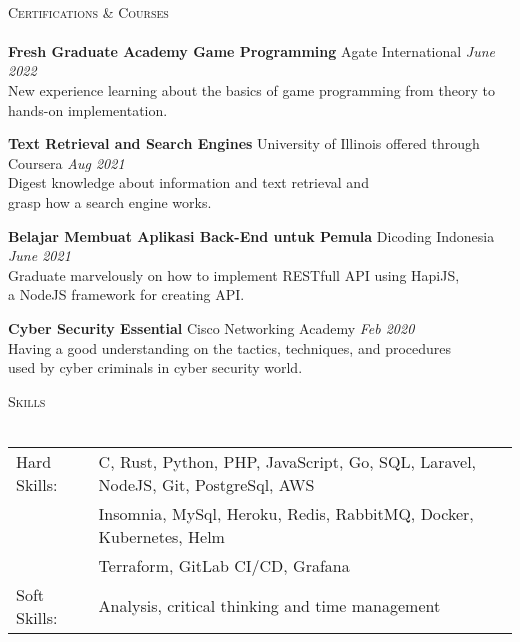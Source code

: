 \documentclass[a4paper]{article}
\newcommand{\lineunder} {
    \vspace*{-8pt} \\
    \hspace*{-18pt} \hrulefill \\
}
\newcommand{\header} [1] {
    {\hspace*{-18pt}\vspace*{6pt} \textsc{#1}}
    \vspace*{-6pt} \lineunder
}
\begin{document}
\

\header{Certifications \& Courses}
\textbf{Fresh Graduate Academy Game Programming} \hfill Agate International \textit{June 2022}\\
New experience learning about the basics of game programming from theory to hands-on implementation.
\vspace*{2mm}

\textbf{Text Retrieval and Search Engines} \hfill University of Illinois offered through Coursera \textit{Aug 2021}\\
Digest knowledge about information and text retrieval and\\ grasp how a search engine works.
\vspace*{2mm}

\textbf{Belajar Membuat Aplikasi Back-End untuk Pemula} \hfill Dicoding Indonesia \textit{June 2021}\\
Graduate marvelously on how to implement RESTfull API using HapiJS,\\a NodeJS framework for creating API.
\vspace*{2mm}



\textbf{Cyber Security Essential} \hfill Cisco Networking Academy \textit{Feb 2020}\\
Having a good understanding on the tactics, techniques, and procedures \\used by cyber criminals in cyber security world.
\vspace*{2mm}

\header{Skills}
\begin{tabular}{ l l }
	Hard Skills:              & C, Rust, Python, PHP, JavaScript, Go, SQL, Laravel, NodeJS, Git, PostgreSql, AWS\\ & Insomnia, MySql, Heroku, Redis, RabbitMQ, Docker, Kubernetes, Helm\\ & Terraform, GitLab CI/CD, Grafana\\
	Soft Skills:                    & Analysis, critical thinking and time management\\
\end{tabular}
\vspace{2mm}

\ 
\end{document}

